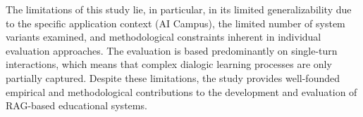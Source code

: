 The limitations of this study lie, in particular, in its limited generalizability due to the specific application context (AI Campus), the limited number of system variants examined, and methodological constraints inherent in individual evaluation approaches. The evaluation is based predominantly on single-turn interactions, which means that complex dialogic learning processes are only partially captured. Despite these limitations, the study provides well-founded empirical and methodological contributions to the development and evaluation of RAG-based educational systems.